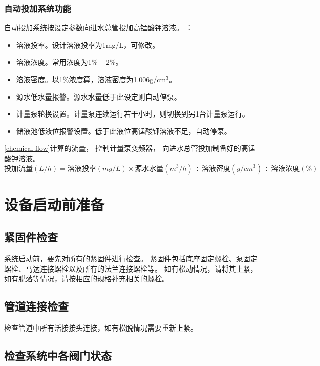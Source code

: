 \documentclass[UTF8,a4paper,12pt,titlepage]{ctexart}
\begin{document}
      \subsubsection{自动投加系统功能}
         自动投加系统按设定参数向进水总管投加高锰酸钾溶液。
         ：
         \begin{itemize}
            \item 溶液投率。设计溶液投率为1mg/L，可修改。
            \item 溶液浓度。常用浓度为1\% -- 2\%。
            \item 溶液密度。以1\%浓度算，溶液密度为1.006g/cm$^{3}$。
            \item 源水低水量报警。源水水量低于此设定则自动停泵。
            \item 计量泵轮换设置。计量泵连续运行若干小时，则切换到另1台计量泵运行。
            \item 储液池低液位报警设置。低于此液位高锰酸钾溶液不足，自动停泵。
         \end{itemize}
         \ref{chemical-flow}计算的流量，
         控制计量泵变频器，
         向进水总管投加制备好的高锰酸钾溶液。
         \begin{equation}
            \label{chemical-flow}
            \mbox{投加流量}(L/h) = \mbox{溶液投率}(mg/L) \times 
            \mbox{源水水量}(m^3/h) \div 
            \mbox{溶液密度}(g/cm^3) \div 
            \mbox{溶液浓度}(\%)
         \end{equation}


\newpage %

\section{设备启动前准备}\label{sec:sg1}
   \subsection{紧固件检查}
      系统启动前，要先对所有的紧固件进行检查。
      紧固件包括底座固定螺栓、泵固定螺栓、马达连接螺栓以及所有的法兰连接螺栓等。
      如有松动情况，请将其上紧，如有脱落等情况，请按相应的规格补充相关的螺栓。

   \subsection{管道连接检查}
      检查管道中所有活接接头连接，如有松脱情况需要重新上紧。

   \subsection{检查系统中各阀门状态}
\end{document}
